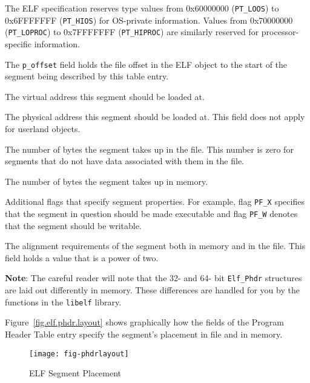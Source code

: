 \documentclass[a4paper]{report}
\makeatletter
\newcommand{\constant}[1]{\texttt{#1}}
\newcommand{\library}[1]{\texttt{#1}}
\newcommand{\parameter}[1]{\texttt{#1}}
\newcommand{\type}[1]{\texttt{#1}}
\newenvironment{callout}[2][blue]{%
  \begingroup\newcommand{\@cocolor}{#1}%
  \newcommand{\@cogroup}[1]{#2}}{\endgroup}
\newcommand{\@co}[1]{\framebox{\textbf{\color{\@cocolor}#1}}}
\newcommand{\coref}[1]{%
  \hypertarget{\@cogroup.#1.cr}{%
    \hyperlink{\@cogroup.#1.co}{\@co{#1}}}}
\makeatother
\begin{document}
\begin{callout}{phdr}
\begin{description}
    The ELF specification reserves type values from 0x60000000
    (\constant{PT\_LOOS}) to 0x6FFFFFFF (\constant{PT\_HIOS}) for
    OS-private information.  Values from 0x70000000
    (\constant{PT\_LOPROC}) to 0x7FFFFFFF (\constant{PT\_HIPROC}) are
    similarly reserved for processor-specific information.

  \item[\coref{2}] The \parameter{p\_offset} field holds the file
    offset in the ELF object to the start of the segment being
    described by this table entry.

  \item[\coref{3}] The virtual address this segment should be loaded
    at.

  \item[\coref{4}] The physical address this segment should be loaded
    at.  This field does not apply for userland objects.

  \item[\coref{5}] The number of bytes the segment takes up in the
    file.  This number is zero for segments that do not have data
    associated with them in the file.

  \item[\coref{6}] The number of bytes the segment takes up in memory.

  \item[\coref{7}] Additional flags that specify segment properties.
    For example, flag \constant{PF\_X} specifies that the segment in
    question should be made executable and flag \constant{PF\_W}
    denotes that the segment should be writable.

  \item[\coref{8}] The alignment requirements of the segment both in
    memory and in the file.  This field holds a value that is a power
    of two.
  \end{description}
\end{callout}

\textbf{Note}: The careful reader will note that the 32- and 64- bit
\type{Elf\_Phdr} structures are laid out differently in memory.  These
differences are handled for you by the functions in the
\library{libelf} library.

Figure~\vref{fig.elf.phdr.layout} shows graphically how the fields of
the Program Header Table entry specify the segment's placement in file
and in memory.

\begin{figure}
  \caption{ELF Segment Placement}\label{fig.elf.phdr.layout}
  \begin{center}
    \texttt{[image: fig-phdrlayout]}
  \end{center}
\end{figure}
\end{document}
